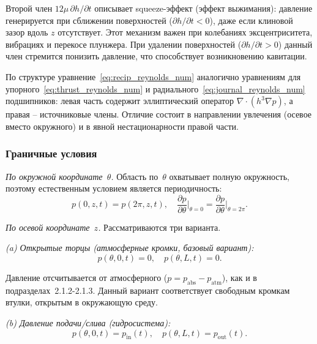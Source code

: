 \FloatBarrier

Второй член $12\mu\,\partial h/\partial t$ описывает squeeze-эффект (эффект выжимания): давление генерируется при сближении поверхностей ($\partial h/\partial t < 0$), даже если клиновой зазор вдоль $z$ отсутствует. Этот механизм важен при колебаниях эксцентриситета, вибрациях и перекосе плунжера. При удалении поверхностей ($\partial h/\partial t > 0$) данный член стремится понизить давление, что способствует возникновению кавитации.

По структуре уравнение~\eqref{eq:recip_reynolds_num} аналогично уравнениям для упорного~\eqref{eq:thrust_reynolds_num} и радиального~\eqref{eq:journal_reynolds_num} подшипников: левая часть содержит эллиптический оператор $\nabla \cdot (h^3 \nabla p)$, а правая -- источниковые члены. Отличие состоит в направлении увлечения (осевое вместо окружного) и в явной нестационарности правой части.


\subsubsection*{Граничные условия}

\textit{По окружной координате~$\theta$.} Область по~$\theta$ охватывает полную окружность, поэтому естественным условием является периодичность:
\begin{equation}
p(0, z, t) = p(2\pi, z, t), \quad
\frac{\partial p}{\partial\theta}\bigg|_{\theta=0}
= \frac{\partial p}{\partial\theta}\bigg|_{\theta=2\pi}.
\label{eq:recip_bc_periodic}
\end{equation}

\textit{По осевой координате~$z$.} Рассматриваются три варианта.

\textit{(a) Открытые торцы (атмосферные кромки, базовый вариант):}
\begin{equation}
p(\theta, 0, t) = 0, \quad p(\theta, L, t) = 0.
\label{eq:recip_bc_open}
\end{equation}

Давление отсчитывается от атмосферного ($p = p_{\mathrm{abs}} - p_{\mathrm{atm}}$), как и в подразделах~2.1.2-2.1.3. Данный вариант соответствует свободным кромкам втулки, открытым в окружающую среду.

\textit{(b) Давление подачи/слива (гидросистема):}
\begin{equation}
p(\theta, 0, t) = p_{\mathrm{in}}(t), \quad p(\theta, L, t) = p_{\mathrm{out}}(t).
\label{eq:recip_bc_pressure}
\end{equation}

